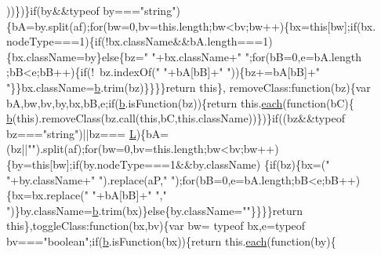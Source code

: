 \begin{DoxyCode}
      ))\})\}\textcolor{keywordflow}{if}(by&&typeof by===\textcolor{stringliteral}{"string"})\{bA=by.split(af);\textcolor{keywordflow}{for}(bw=0,bv=this.length;bw<bv;bw++)\{bx=\textcolor{keyword}{this}[bw];\textcolor{keywordflow}{if}(bx.
      nodeType===1)\{\textcolor{keywordflow}{if}(!bx.className&&bA.length===1)\{bx.className=by\}\textcolor{keywordflow}{else}\{bz=\textcolor{stringliteral}{" "}+bx.className+\textcolor{stringliteral}{" "};\textcolor{keywordflow}{for}(bB=0,e=bA.length
      ;bB<e;bB++)\{\textcolor{keywordflow}{if}(!~bz.indexOf(\textcolor{stringliteral}{" "}+bA[bB]+\textcolor{stringliteral}{" "}))\{bz+=bA[bB]+\textcolor{stringliteral}{" "}\}\}bx.className=\hyperlink{jquery_8js_aa4026ad5544b958e54ce5e106fa1c805}{b}.trim(bz)\}\}\}\}\textcolor{keywordflow}{return} \textcolor{keyword}{this}\},
      removeClass:\textcolor{keyword}{function}(bz)\{var bA,bw,bv,by,bx,bB,e;\textcolor{keywordflow}{if}(\hyperlink{jquery_8js_aa4026ad5544b958e54ce5e106fa1c805}{b}.isFunction(bz))\{\textcolor{keywordflow}{return} this.\hyperlink{jquery_8js_a871ff39db627c54c710a3e9909b8234c}{each}(\textcolor{keyword}{function}(bC)\{
      \hyperlink{jquery_8js_aa4026ad5544b958e54ce5e106fa1c805}{b}(\textcolor{keyword}{this}).removeClass(bz.call(\textcolor{keyword}{this},bC,\textcolor{keyword}{this}.className))\})\}\textcolor{keywordflow}{if}((bz&&typeof bz===\textcolor{stringliteral}{"string"})||bz===
      \hyperlink{jquery_8js_a38ee4c0b5f4fe2a18d0c783af540d253}{L})\{bA=(bz||\textcolor{stringliteral}{""}).split(af);\textcolor{keywordflow}{for}(bw=0,bv=this.length;bw<bv;bw++)\{by=\textcolor{keyword}{this}[bw];\textcolor{keywordflow}{if}(by.nodeType===1&&by.className)
      \{\textcolor{keywordflow}{if}(bz)\{bx=(\textcolor{stringliteral}{" "}+by.className+\textcolor{stringliteral}{" "}).replace(aP,\textcolor{stringliteral}{" "});\textcolor{keywordflow}{for}(bB=0,e=bA.length;bB<e;bB++)\{bx=bx.replace(\textcolor{stringliteral}{" "}+bA[bB]+\textcolor{stringliteral}{"
       "},\textcolor{stringliteral}{" "})\}by.className=\hyperlink{jquery_8js_aa4026ad5544b958e54ce5e106fa1c805}{b}.trim(bx)\}\textcolor{keywordflow}{else}\{by.className=\textcolor{stringliteral}{""}\}\}\}\}\textcolor{keywordflow}{return} \textcolor{keyword}{this}\},toggleClass:\textcolor{keyword}{function}(bx,bv)\{var bw=
      typeof bx,e=typeof bv===\textcolor{stringliteral}{"boolean"};\textcolor{keywordflow}{if}(\hyperlink{jquery_8js_aa4026ad5544b958e54ce5e106fa1c805}{b}.isFunction(bx))\{\textcolor{keywordflow}{return} this.\hyperlink{jquery_8js_a871ff39db627c54c710a3e9909b8234c}{each}(\textcolor{keyword}{function}(by)\{

\end{DoxyCode}

